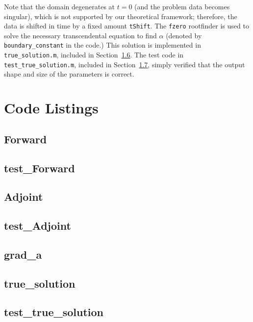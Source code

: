 \documentclass[letterpaper, 10pt]{amsart}
\theoremstyle{definition}
\theoremstyle{remark}
\begin{document}
Note that the domain degenerates at $t=0$ (and the problem data becomes singular), which is not supported by our theoretical framework; therefore, the data is shifted in time by a fixed amount \verb+tShift+.
The \verb+fzero+ rootfinder is used to solve the necessary transcendental equation to find $\alpha$ (denoted by \verb+boundary_constant+ in the code.)
This solution is implemented in \verb+true_solution.m+, included in Section~\ref{sec:code-listing-true-solution}.
The test code in \verb+test_true_solution.m+, included in Section~\ref{sec:code-listing-test-true-solution}, simply verified that the output shape and size of the parameters is correct.


\appendix
\section{Code Listings}
{\small 
\subsection{Forward}\label{sec:code-listing-forward}


\subsection{test\_Forward}\label{sec:code-listing-test-forward}


\subsection{Adjoint}\label{sec:code-listing-adjoint}


\subsection{test\_Adjoint}\label{sec:code-listing-test-adjoint}


\subsection{grad\_a}\label{sec:code-listing-grad-s}


\subsection{true\_solution}\label{sec:code-listing-true-solution}


\subsection{test\_true\_solution}\label{sec:code-listing-test-true-solution}

}
\end{document}
